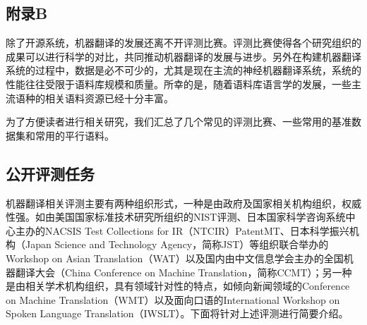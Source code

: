 
\begin{appendices}
\chapter{附录B}
\label{appendix-B}
\parinterval 除了开源系统，机器翻译的发展还离不开评测比赛。评测比赛使得各个研究组织的成果可以进行科学的对比，共同推动机器翻译的发展与进步。另外在构建机器翻译系统的过程中，数据是必不可少的，尤其是现在主流的神经机器翻译系统，系统的性能往往受限于语料库规模和质量。所幸的是，随着语料库语言学的发展，一些主流语种的相关语料资源已经十分丰富。

\parinterval 为了方便读者进行相关研究，我们汇总了几个常见的评测比赛、一些常用的基准数据集和常用的平行语料。

\section{公开评测任务}
\parinterval 机器翻译相关评测主要有两种组织形式，一种是由政府及国家相关机构组织，权威性强。如由美国国家标准技术研究所组织的NIST评测、日本国家科学咨询系统中心主办的NACSIS Test Collections for IR（NTCIR）PatentMT、日本科学振兴机构（Japan Science and Technology Agency，简称JST）等组织联合举办的Workshop on Asian Translation（WAT）以及国内由中文信息学会主办的全国机器翻译大会（China Conference on Machine Translation，简称CCMT）；另一种是由相关学术机构组织，具有领域针对性的特点，如倾向新闻领域的Conference on Machine Translation（WMT）以及面向口语的International Workshop on Spoken Language Translation（IWSLT）。下面将针对上述评测进行简要介绍。


\end{appendices}
